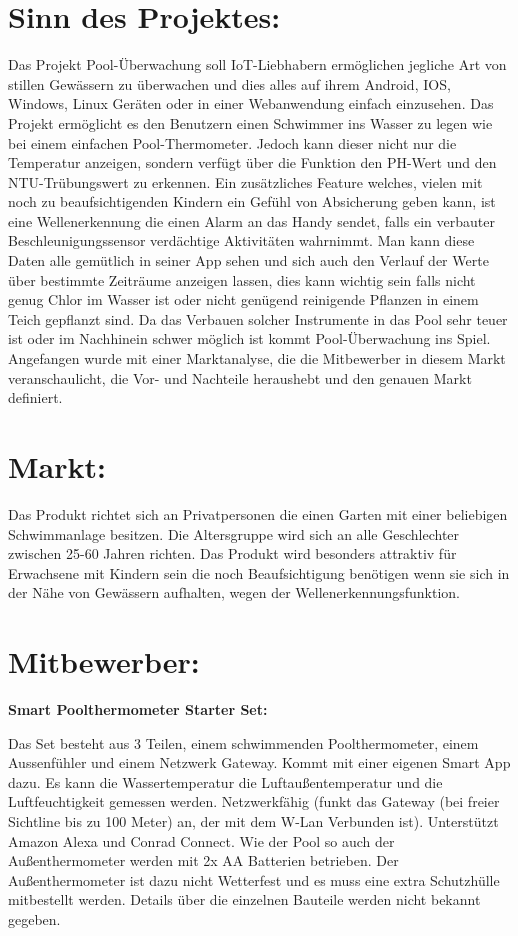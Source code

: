 \section{Sinn des Projektes:}
Das Projekt Pool-Überwachung soll IoT-Liebhabern ermöglichen jegliche Art von stillen Gewässern zu überwachen und dies alles auf ihrem Android, IOS, Windows, Linux Geräten oder in einer Webanwendung einfach einzusehen. 
Das Projekt ermöglicht es den Benutzern einen Schwimmer ins Wasser zu legen wie bei einem einfachen Pool-Thermometer. 
Jedoch kann dieser nicht nur die Temperatur anzeigen, sondern verfügt über die Funktion den PH-Wert und den NTU-Trübungswert zu erkennen. Ein zusätzliches Feature welches, vielen mit noch zu beaufsichtigenden Kindern ein Gefühl von Absicherung geben kann, ist eine Wellenerkennung die einen Alarm an das Handy sendet, falls ein verbauter Beschleunigungssensor verdächtige Aktivitäten wahrnimmt. 
Man kann diese Daten alle gemütlich in seiner App sehen und sich auch den Verlauf der Werte über bestimmte Zeiträume anzeigen lassen, dies kann wichtig sein falls nicht genug Chlor im Wasser ist oder nicht genügend reinigende Pflanzen in einem Teich gepflanzt sind. Da das Verbauen solcher Instrumente in das Pool sehr teuer ist oder im Nachhinein schwer möglich ist kommt Pool-Überwachung ins Spiel. 
\newline
Angefangen wurde mit einer Marktanalyse, die die Mitbewerber in diesem Markt veranschaulicht, die Vor- und Nachteile heraushebt und den genauen Markt definiert.

\section{Markt:}
Das Produkt richtet sich an Privatpersonen 
die einen Garten mit einer beliebigen Schwimmanlage besitzen. 
Die Altersgruppe wird sich an alle Geschlechter zwischen 25-60 Jahren richten. 
Das Produkt wird besonders attraktiv für Erwachsene 
mit Kindern sein die noch Beaufsichtigung benötigen wenn sie sich
in der Nähe von Gewässern aufhalten, wegen der Wellenerkennungsfunktion.
\section{Mitbewerber:}
\textbf{Smart Poolthermometer Starter Set:}


Das Set besteht aus 3 Teilen, einem schwimmenden Poolthermometer, 
einem Aussenfühler und einem Netzwerk Gateway. Kommt mit einer eigenen Smart App dazu. 
Es kann die Wassertemperatur die Luftaußentemperatur und die Luftfeuchtigkeit gemessen werden.
Netzwerkfähig (funkt das Gateway (bei freier Sichtline bis zu 100 Meter) an, 
der mit dem W-Lan Verbunden ist). Unterstützt Amazon Alexa und Conrad Connect. 
Wie der Pool so auch der Außenthermometer werden mit 2x AA Batterien betrieben. 
Der Außenthermometer ist dazu nicht Wetterfest und es muss eine extra Schutzhülle 
mitbestellt werden. Details über die einzelnen Bauteile werden nicht bekannt gegeben.


